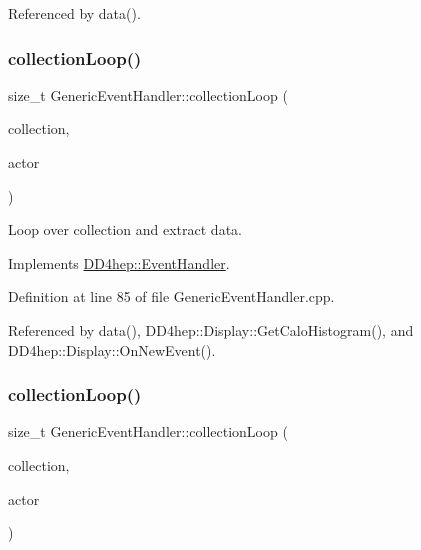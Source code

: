 Referenced by data().

\hypertarget{class_d_d4hep_1_1_generic_event_handler_a1186d6415d8d7e01f51993e204d5931f}{}\label{class_d_d4hep_1_1_generic_event_handler_a1186d6415d8d7e01f51993e204d5931f} 
\subsubsection{\texorpdfstring{collection\+Loop()}{collectionLoop()}\hspace{0.1cm}{\footnotesize\ttfamily [1/2]}}
{\footnotesize\ttfamily size\+\_\+t Generic\+Event\+Handler\+::collection\+Loop (\begin{DoxyParamCaption}\item[{const std\+::string \&}]{collection,  }\item[{\hyperlink{struct_d_d4hep_1_1_d_d_eve_hit_actor}{D\+D\+Eve\+Hit\+Actor} \&}]{actor }\end{DoxyParamCaption})\hspace{0.3cm}{\ttfamily [virtual]}}



Loop over collection and extract data. 



Implements \hyperlink{class_d_d4hep_1_1_event_handler_a454baeb81b675f3ebd8bb4293064b787}{D\+D4hep\+::\+Event\+Handler}.



Definition at line 85 of file Generic\+Event\+Handler.\+cpp.



Referenced by data(), D\+D4hep\+::\+Display\+::\+Get\+Calo\+Histogram(), and D\+D4hep\+::\+Display\+::\+On\+New\+Event().

\hypertarget{class_d_d4hep_1_1_generic_event_handler_aa733b6de00ba09d05b2c4e33b0cd3232}{}\label{class_d_d4hep_1_1_generic_event_handler_aa733b6de00ba09d05b2c4e33b0cd3232} 
\subsubsection{\texorpdfstring{collection\+Loop()}{collectionLoop()}\hspace{0.1cm}{\footnotesize\ttfamily [2/2]}}
{\footnotesize\ttfamily size\+\_\+t Generic\+Event\+Handler\+::collection\+Loop (\begin{DoxyParamCaption}\item[{const std\+::string \&}]{collection,  }\item[{\hyperlink{struct_d_d4hep_1_1_d_d_eve_particle_actor}{D\+D\+Eve\+Particle\+Actor} \&}]{actor }\end{DoxyParamCaption})\hspace{0.3cm}{\ttfamily [virtual]}}



